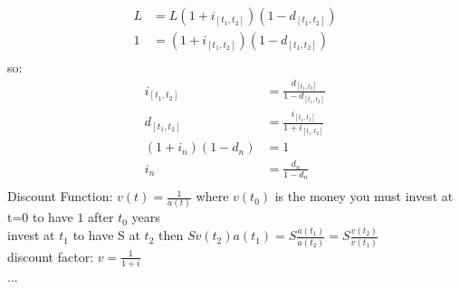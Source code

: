 \documentclass[12pt]{article}
\begin{document}
	\begin{align*}
		L &=  L(1+i_{[t_1, t_2]})(1 - d_{[t_1, t_2]}) \\
		1 &= (1 + i_{[t_1, t_2]})(1 - d_{[t_1, t_2]}) \\
	\end{align*}
	so:
	\begin{align*}
		i_{[t_1, t_2]} &= \frac{d_{[t_1, t_2]}}{1 - d_{[t_1, t_2]}}  \\
		d_{[t_1, t_2]} &= \frac{i_{[t_1, t_2]}}{1 + i_{[t_1, t_2]}}  \\
		(1 + i_n)(1 - d_n) &=  1 \\
		i_n &= \frac{d_n}{1 - d_n}  \\
	\end{align*}
	Discount Function: $ v(t) = \frac{1}{a(t)} $ 
	where $ v(t_0) $ is the money you must invest at t=0 to have $ 1 $ after
	$ t_0 $ years \\
	invest at $ t_1 $ to have S at $ t_2 $ then 
	$ Sv(t_2)a(t_1) = S \frac{a(t_1)}{a(t_2)} = S \frac{v(t_2)}{v(t_1)}   $ \\
	discount factor: $ v = \frac{1}{1 + i} $ \\
	...
\end{document}
